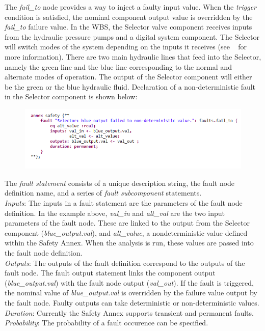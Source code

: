 The \textit{fail\_to} node provides a way to inject a faulty input value. When the \textit{trigger} condition is satisfied, the nominal component output value is overridden by the \textit{fail\_to} failure value. In the WBS, the Selector valve component receives inputs from the hydraulic pressure pumps and a digital system component. The Selector will switch modes of the system depending on the inputs it receives (see ~\cite{AIR6110,Stewart17:IMBSA} for more information). There are two main hydraulic lines that feed into the Selector, namely the green line and the blue line corresponding to the normal and alternate modes of operation. The output of the Selector component will either be the green or the blue hydraulic fluid. Declaration of a non-deterministic fault in the Selector component is shown below:
\begin{figure}[h!]
\vspace{-0.17in}
\begin{center}
\includegraphics[trim=0 15 0 11,clip,width=1.0\textwidth]{images/annex.png}
\end{center}
\vspace{-0.40in}
\end{figure}

The \textit{fault statement} consists of a unique description string, the fault node definition name, and a series of \textit{fault subcomponent} statements. \\
\textit{Inputs}: The inputs in a fault statement are the parameters of the fault node definition. In the example above, \textit{val\_in} and \textit{alt\_val} are the two input parameters of the fault node. These are linked to the output from the Selector component (\textit{blue\_output.val}), and \textit{alt\_value}, a nondeterministic value defined within the Safety Annex. When the analysis is run, these values are passed into the fault node definition.\\
\textit{Outputs}: The outputs of the fault definition correspond to the outputs of the fault node. The fault output statement links the component output (\textit{blue\_output.val}) with the fault node output (\textit{val\_out}). If the fault is triggered, the nominal value of \textit{blue\_output.val} is overridden by the failure value output by the fault node. Faulty outputs can take deterministic or non-deterministic values. \\
\textit{Duration}: Currently the Safety Annex supports transient and permanent faults.\\
\textit{Probability}: The probability of a fault occurence can be specified.





